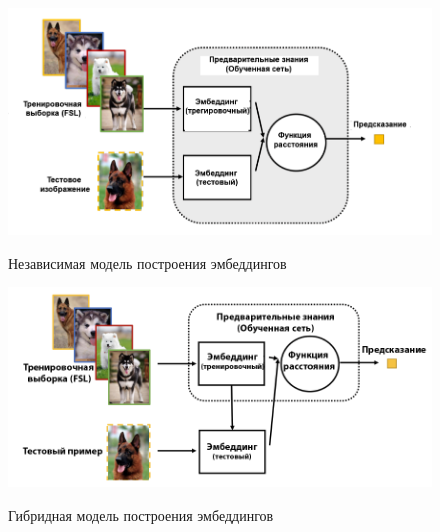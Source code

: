 \begin{figure}[h!]
\caption{Независимая модель построения эмбеддингов}
\centering
\includegraphics[width=16cm]{Images/FSL_Embedding_general_rus_noback.png}
\label{fig:FSL_Embedding_general_rus_noback}
\end{figure}

\begin{figure}[h!]
\caption{Гибридная модель построения эмбеддингов}
\centering
\includegraphics[width=16cm]{Images/FSL_Embedding_hybrid_rus_noback.png}
\label{fig:FSL_Embedding_hybrid_rus_noback}
\end{figure}